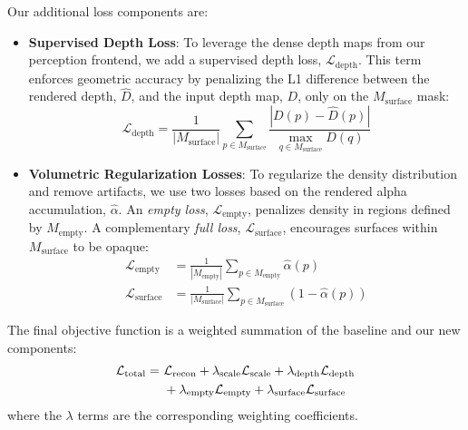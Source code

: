 Our additional loss components are:
\begin{itemize}
	\item \textbf{Supervised Depth Loss}: To leverage the dense depth maps from our perception frontend, we add a supervised depth loss, $\mathcal{L}_{\text{depth}}$. This term enforces geometric accuracy by penalizing the L1 difference between the rendered depth, $\hat{D}$, and the input depth map, $D$, only on the $M_{\text{surface}}$ mask:
	      \begin{equation}
		      \mathcal{L}_{\text{depth}} = \frac{1}{|M_{\text{surface}}|} \sum_{p \in M_{\text{surface}}} \frac{|D(p) - \hat{D}(p)|}{\max_{q \in M_{\text{surface}}} D(q)}
	      \end{equation}

	\item \textbf{Volumetric Regularization Losses}: To regularize the density distribution and remove artifacts, we use two losses based on the rendered alpha accumulation, $\hat{\alpha}$. An \textit{empty loss}, $\mathcal{L}_{\text{empty}}$, penalizes density in regions defined by $M_{\text{empty}}$. A complementary \textit{full loss}, $\mathcal{L}_{\text{surface}}$, encourages surfaces within $M_{\text{surface}}$ to be opaque:
	      \begin{align}
		      \mathcal{L}_{\text{empty}}   & = \frac{1}{|M_{\text{empty}}|} \sum_{p \in M_{\text{empty}}} \hat{\alpha}(p)           \\
		      \mathcal{L}_{\text{surface}} & = \frac{1}{|M_{\text{surface}}|} \sum_{p \in M_{\text{surface}}} (1 - \hat{\alpha}(p))
	      \end{align}
\end{itemize}

The final objective function is a weighted summation of the baseline and our new components:
\begin{align}
	\mathcal{L}_{\text{total}} =\  & \mathcal{L}_{\text{recon}} + \lambda_{\text{scale}}\mathcal{L}_{\text{scale}} + \lambda_{\text{depth}}\mathcal{L}_{\text{depth}} \notag \\
	                               & + \lambda_{\text{empty}}\mathcal{L}_{\text{empty}} + \lambda_{\text{surface}}\mathcal{L}_{\text{surface}}
\end{align}
where the $\lambda$ terms are the corresponding weighting coefficients.